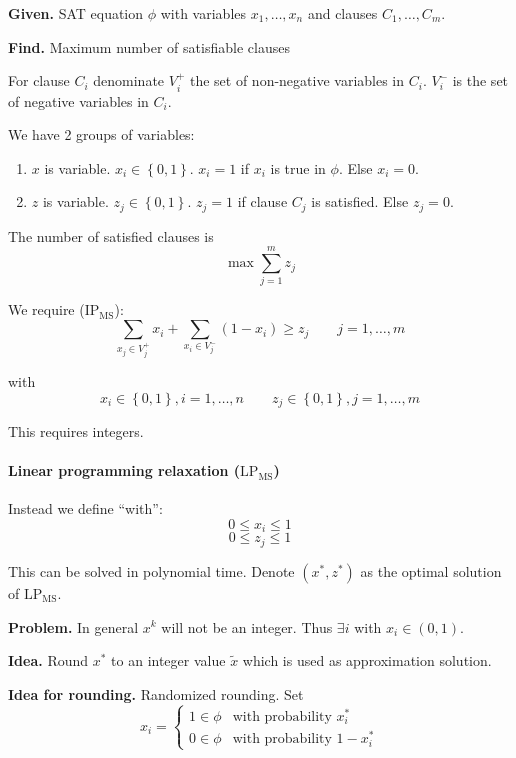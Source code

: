 \documentclass[a4paper]{article}
\newcommand{\given}[1]{\textbf{Given.} #1\par}
\newcommand{\find}[1]{\textbf{Find.} #1\par}
\newcommand{\probl}[1]{\text{\textsc{#1}}}
\newcommand{\set}[1]{\left\{#1\right\}}
\newenvironment{spec}[0]{\begin{framed}}{\end{framed}}
\begin{document}
\subsubsection{\probl{MaxSAT}}
%
\begin{spec}
  \given{SAT equation $\phi$ with variables $x_1, \ldots, x_n$ and clauses $C_1, \ldots, C_m$.}
  \find{Maximum number of satisfiable clauses}
\end{spec}

For clause $C_i$ denominate $V_i^+$ the set of non-negative variables in $C_i$.
$V_i^-$ is the set of negative variables in $C_i$.

We have 2 groups of variables:
\begin{enumerate}
  \item $x$ is variable. $x_i \in \set{0,1}$. $x_i = 1$ if $x_i$ is true in $\phi$. Else $x_i = 0$.
  \item $z$ is variable. $z_j \in \set{0,1}$. $z_j = 1$ if clause $C_j$ is satisfied. Else $z_j = 0$.
\end{enumerate}

The number of satisfied clauses is
\[
  \max \sum_{j=1}^m z_j
\]

We require ($\text{IP}_{\text{MS}}$):
\[
  \sum_{x_j \in V_j^+} x_i + \sum_{x_i \in V_j^-} (1 - x_i) \geq z_j
      \qquad j = 1,\ldots,m
\]

with
\[
      x_i \in \set{0,1}, i = 1, \ldots, n \qquad
      z_j \in \set{0,1}, j = 1, \ldots, m
\]

This requires integers.

\paragraph{Linear programming relaxation ($\text{LP}_{\text{MS}}$)}
Instead we define ``with'':
\[
  0 \leq x_i \leq 1
\] \[
  0 \leq z_j \leq 1
\]

This can be solved in polynomial time.
Denote $(x^*, z^*)$ as the optimal solution of $\text{LP}_{\text{MS}}$.

\textbf{Problem.}
  In general $x^k$ will not be an integer. Thus $\exists i$ with $x_i \in (0,1)$.

\textbf{Idea.}
  Round $x^*$ to an integer value $\tilde{x}$ which is used as approximation solution.

\textbf{Idea for rounding.}
  Randomized rounding. Set
\[
  x_i = \begin{cases}
    1 \in \phi & \text{with probability } x_i^* \\
    0 \in \phi & \text{with probability } 1 - x_i^*
  \end{cases}
\]
\end{document}
